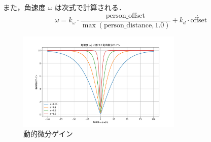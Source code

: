 また，角速度 \(\omega\) は次式で計算される．
\begin{equation}
    \omega = k_\omega \cdot \frac{\text{person\_offset}}{\max(\text{person\_distance}, 1.0)} + k_d \cdot \dot{\text{offset}}
\end{equation}

\begin{figure}[H]
    \centering
    \includegraphics[width=0.7\textwidth]{figure/dynamicgain.pdf}
    \caption{動的微分ゲイン}
    \label{fig:dynamicgain}
\end{figure}

